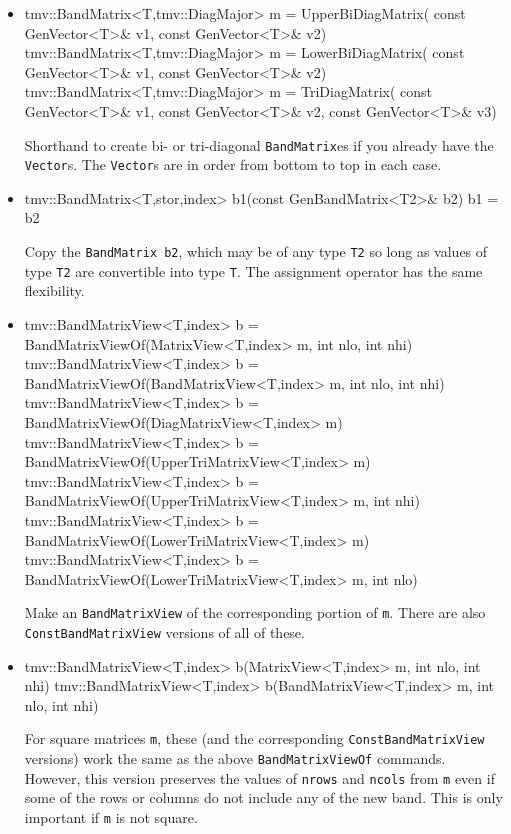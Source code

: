 \documentclass[twoside,letterpaper,11pt]{article}
\renewcommand{\tt}[1]{{\lstinline {#1}}}
\begin{document}
\begin{itemize}
\item
\begin{tmvcode}
tmv::BandMatrix<T,tmv::DiagMajor> m = UpperBiDiagMatrix(
      const GenVector<T>& v1, const GenVector<T>& v2)
tmv::BandMatrix<T,tmv::DiagMajor> m = LowerBiDiagMatrix(
      const GenVector<T>& v1, const GenVector<T>& v2)
tmv::BandMatrix<T,tmv::DiagMajor> m = TriDiagMatrix(
      const GenVector<T>& v1,  const GenVector<T>& v2, 
      const GenVector<T>& v3)
\end{tmvcode}
Shorthand to create bi- or tri-diagonal \tt{BandMatrix}es if you already have the 
\tt{Vector}s.  The \tt{Vector}s are in order from bottom to top in each case.

\item
\begin{tmvcode}
tmv::BandMatrix<T,stor,index> b1(const GenBandMatrix<T2>& b2)
b1 = b2
\end{tmvcode}
Copy the \tt{BandMatrix b2}, which may be of any type \tt{T2} so long
as values of type \tt{T2} are convertible into type \tt{T}.
The assignment operator has the same flexibility.

\item
\begin{tmvcode}
tmv::BandMatrixView<T,index> b = 
      BandMatrixViewOf(MatrixView<T,index> m, int nlo, int nhi)
tmv::BandMatrixView<T,index> b = 
      BandMatrixViewOf(BandMatrixView<T,index> m, int nlo, int nhi)
tmv::BandMatrixView<T,index> b = 
      BandMatrixViewOf(DiagMatrixView<T,index> m)
tmv::BandMatrixView<T,index> b = 
      BandMatrixViewOf(UpperTriMatrixView<T,index> m)
tmv::BandMatrixView<T,index> b = 
      BandMatrixViewOf(UpperTriMatrixView<T,index> m, int nhi)
tmv::BandMatrixView<T,index> b = 
      BandMatrixViewOf(LowerTriMatrixView<T,index> m)
tmv::BandMatrixView<T,index> b = 
      BandMatrixViewOf(LowerTriMatrixView<T,index> m, int nlo)
\end{tmvcode}
Make an \tt{BandMatrixView} of the corresponding portion of \tt{m}.  
There are also \tt{ConstBandMatrixView} versions of all of these.  

\item
\begin{tmvcode}
tmv::BandMatrixView<T,index> b(MatrixView<T,index> m, 
      int nlo, int nhi)
tmv::BandMatrixView<T,index> b(BandMatrixView<T,index> m, 
      int nlo, int nhi)
\end{tmvcode}
For square matrices \tt{m}, these (and the corresponding \tt{ConstBandMatrixView}
versions) work the same as the above \tt{BandMatrixViewOf}
commands.  However, this version preserves the values of \tt{nrows} and \tt{ncols}
from \tt{m}
even if some of the rows or columns do not include any of the new band.
This is only important if \tt{m} is not square.


\end{itemize}
\end{document}
